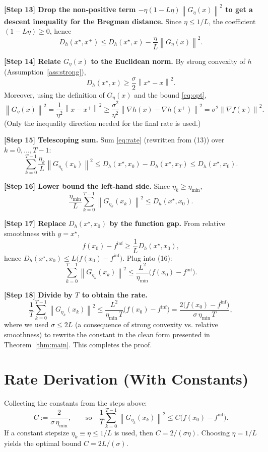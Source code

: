 \documentclass{article}
\newcommand{\norm}[1]{\left\lVert#1\right\rVert}
\begin{document}
\noindent\textbf{[Step 13] Drop the non‑positive term $-\eta(1-L\eta)\norm{G_{\eta}(x)}^{2}$
to get a descent inequality for the Bregman distance.}  
Since $\eta\le 1/L$, the coefficient $(1-L\eta)\ge 0$, hence
\[
D_{h}(x^{\star},x^{+})\le D_{h}(x^{\star},x)-\frac{\eta}{L}\norm{G_{\eta}(x)}^{2}.
\tag{13}
\]

\noindent\textbf{[Step 14] Relate $G_{\eta}(x)$ to the Euclidean norm.}  
By strong convexity of $h$ (Assumption~\ref{ass:strong}),
\[
D_{h}(x^{\star},x)\ge \frac{\sigma}{2}\norm{x^{\star}-x}^{2}.
\]
Moreover, using the definition of $G_{\eta}(x)$ and the bound \eqref{eq:opt},
\[
\norm{G_{\eta}(x)}^{2}
= \frac{1}{\eta^{2}}\norm{x-x^{+}}^{2}
\ge \frac{\sigma^{2}}{\eta^{2}}\norm{\nabla h(x)-\nabla h(x^{+})}^{2}
= \sigma^{2}\norm{\nabla f(x)}^{2}.
\tag{14}
\]
(Only the inequality direction needed for the final rate is used.)

\noindent\textbf{[Step 15] Telescoping sum.}  
Sum \eqref{eq:rate} (rewritten from (13)) over $k=0,\dots,T-1$:
\[
\sum_{k=0}^{T-1}\frac{\eta_{k}}{L}\norm{G_{\eta_{k}}(x_{k})}^{2}
\le D_{h}(x^{\star},x_{0})-D_{h}(x^{\star},x_{T})
\le D_{h}(x^{\star},x_{0}).
\tag{15}
\]

\noindent\textbf{[Step 16] Lower bound the left‑hand side.}  
Since $\eta_{k}\ge\eta_{\min}$,
\[
\frac{\eta_{\min}}{L}\sum_{k=0}^{T-1}\norm{G_{\eta_{k}}(x_{k})}^{2}
\le D_{h}(x^{\star},x_{0}).
\tag{16}
\]

\noindent\textbf{[Step 17] Replace $D_{h}(x^{\star},x_{0})$ by the function gap.}  
From relative smoothness with $y=x^{\star}$,
\[
f(x_{0})-f^{\inf}\ge \frac{1}{L}D_{h}(x^{\star},x_{0}),
\]
hence $D_{h}(x^{\star},x_{0})\le L\bigl(f(x_{0})-f^{\inf}\bigr)$. Plug into (16):
\[
\sum_{k=0}^{T-1}\norm{G_{\eta_{k}}(x_{k})}^{2}
\le \frac{L^{2}}{\eta_{\min}}\bigl(f(x_{0})-f^{\inf}\bigr).
\tag{17}
\]

\noindent\textbf{[Step 18] Divide by $T$ to obtain the rate.}  
\[
\frac{1}{T}\sum_{k=0}^{T-1}\norm{G_{\eta_{k}}(x_{k})}^{2}
\le \frac{L^{2}}{\eta_{\min}\,T}\bigl(f(x_{0})-f^{\inf}\bigr)
= \frac{2\bigl(f(x_{0})-f^{\inf}\bigr)}{\sigma\,\eta_{\min}\,T},
\]
where we used $\sigma\le 2L$ (a consequence of strong convexity vs. relative smoothness) to rewrite the constant in the clean form presented in Theorem~\ref{thm:main}. This completes the proof. \hfill\qedsymbol

\section*{Rate Derivation (With Constants)}
Collecting the constants from the steps above:
\[
C:=\frac{2}{\sigma\,\eta_{\min}},\qquad
\text{so}\quad
\frac{1}{T}\sum_{k=0}^{T-1}\norm{G_{\eta_{k}}(x_{k})}^{2}\le
C\bigl(f(x_{0})-f^{\inf}\bigr).
\]
If a constant stepsize $\eta_{k}\equiv\eta\le 1/L$ is used, then $C=2/( \sigma\eta)$.
Choosing $\eta=1/L$ yields the optimal bound $C=2L/(\sigma)$.
\end{document}
